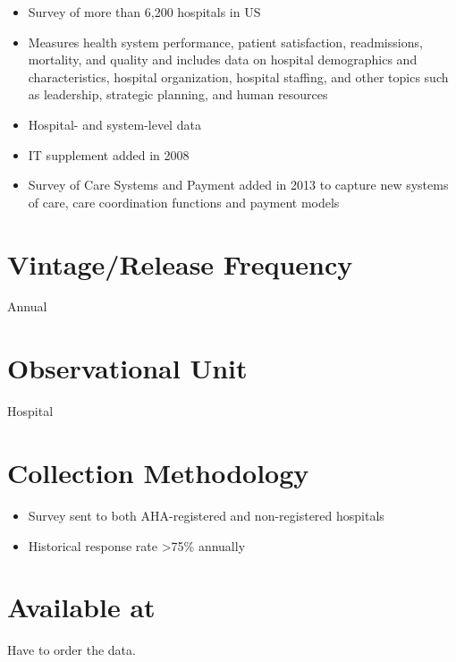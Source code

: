 \documentclass[
]{book}
\providecommand{\tightlist}{%
  \setlength{\itemsep}{0pt}\setlength{\parskip}{0pt}}
\begin{document}
\begin{itemize}
\tightlist
\item
  Survey of more than 6,200 hospitals in US
\item
  Measures health system performance, patient satisfaction, readmissions, mortality, and quality and includes data on hospital demographics and characteristics, hospital organization, hospital staffing, and other topics such as leadership, strategic planning, and human resources
\item
  Hospital- and system-level data
\item
  IT supplement added in 2008
\item
  Survey of Care Systems and Payment added in 2013 to capture new systems of care, care coordination functions and payment models
\end{itemize}

\hypertarget{vintagerelease-frequency-6}{%
\section{Vintage/Release Frequency}\label{vintagerelease-frequency-6}}

Annual

\hypertarget{observational-unit-6}{%
\section{Observational Unit}\label{observational-unit-6}}

Hospital

\hypertarget{collection-methodology-6}{%
\section{Collection Methodology}\label{collection-methodology-6}}

\begin{itemize}
\tightlist
\item
  Survey sent to both AHA-registered and non-registered hospitals
\item
  Historical response rate \textgreater75\% annually
\end{itemize}

\hypertarget{available-at-6}{%
\section{Available at}\label{available-at-6}}

Have to order the data.
\end{document}
